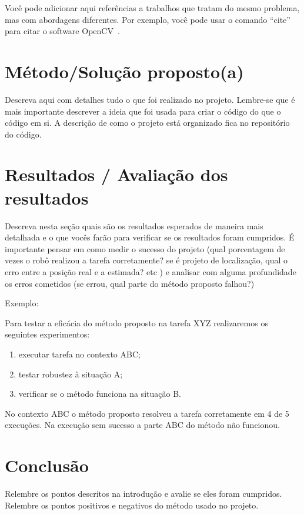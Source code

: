 \documentclass[10pt,conference]{IEEEtran}
\begin{document}
Você pode adicionar aqui referências a trabalhos que tratam do mesmo problema, mas com abordagens diferentes. Por exemplo, você pode usar o comando ``cite'' para citar o software OpenCV~\cite{itseez2015opencv}.

\section{Método/Solução proposto(a)}

Descreva aqui com detalhes tudo o que foi realizado no projeto. Lembre-se que é mais importante descrever a ideia que foi usada para criar o código do que o código em si. A descrição de como o projeto está organizado fica no repositório do código. 

\section{Resultados / Avaliação dos resultados}

Descreva nesta seção quais são os resultados esperados de maneira mais detalhada e o que vocês farão para verificar se os resultados foram cumpridos. É importante pensar em como medir o sucesso do projeto (qual porcentagem de vezes o robô realizou a tarefa corretamente? se é projeto de localização, qual o erro entre a posição real e a estimada? etc ) e analisar com alguma profundidade os erros cometidos (se errou, qual parte do método proposto falhou?)

Exemplo:

Para testar a eficácia do método proposto na tarefa XYZ realizaremos os seguintes experimentos:

\begin{enumerate}
\item executar tarefa no contexto ABC;
\item testar robustez à situação A;
\item verificar se o método funciona na situação B.
\end{enumerate}

No contexto ABC o método proposto resolveu a tarefa corretamente em 4 de 5 execuções. Na execução sem sucesso a parte ABC do método não funcionou.

\section{Conclusão}
Relembre os pontos descritos na introdução e avalie se eles foram cumpridos. Relembre os pontos positivos e negativos do método usado no projeto.
\end{document}
